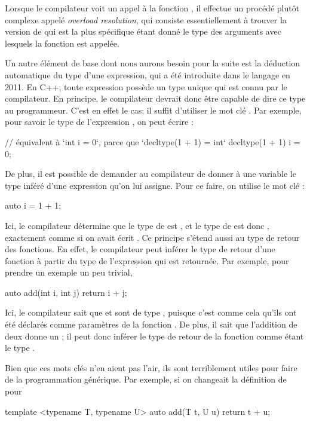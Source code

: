 Lorsque le compilateur voit un appel à la fonction , il
effectue un procédé plutôt complexe appelé \textit{overload resolution}, qui
consiste essentiellement à trouver la version de  qui est
la plus spécifique étant donné le type des arguments avec lesquels la fonction
est appelée.

Un autre élément de base dont nous aurons besoin pour la suite est la déduction
automatique du type d'une expression, qui a été introduite dans le langage en
2011. En C++, toute expression possède un type unique qui est connu par le
compilateur. En principe, le compilateur devrait donc être capable de dire ce
type au programmeur. C'est en effet le cas; il suffit d'utiliser le mot clé
. Par exemple, pour savoir le type de l'expression ,
on peut écrire :
\begin{cpp}
    // équivalent à `int i = 0`, parce que `decltype(1 + 1) = int`
    decltype(1 + 1) i = 0;
\end{cpp}

De plus, il est possible de demander au compilateur de donner à une variable
le type inféré d'une expression qu'on lui assigne. Pour ce faire, on utilise
le mot clé :
\begin{cpp}
    auto i = 1 + 1;
\end{cpp}

Ici, le compilateur détermine que le type de  est , et
le type de  est donc , exactement comme si on avait écrit
. Ce principe s'étend aussi au type de retour des fonctions.
En effet, le compilateur peut inférer le type de retour d'une fonction à partir
du type de l'expression qui est retournée. Par exemple, pour prendre un exemple
un peu trivial,
\begin{cpp}
    auto add(int i, int j) {
        return i + j;
    }
\end{cpp}

Ici, le compilateur sait que  et  sont de type ,
puisque c'est comme cela qu'ils ont été déclarés comme paramètres de la
fonction . De plus, il sait que l'addition de deux  donne
un ; il peut donc inférer le type de retour de la fonction 
comme étant le type .

Bien que ces mots clés n'en aient pas l'air, ils sont terriblement utiles pour
faire de la programmation générique. Par exemple, si on changeait la définition
de  pour
\begin{cpp}
    template <typename T, typename U>
    auto add(T t, U u) {
        return t + u;
    }
\end{cpp}

